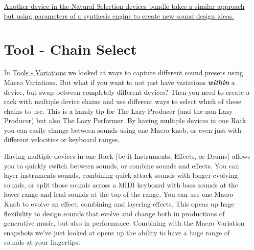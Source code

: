 \documentclass[
  12pt,
  letterpaper,
  oneside,
  open=any]{scrbook}
\begin{document}
\href{https://dillonbastan.com/store/maxforlive/index.php?product=natural-selection-s}{Another
device in the Natural Selection devices bundle takes a similar approach
but using parameters of a synthesis engine to create new sound design
ideas.}


\chapter{Tool - Chain Select}\label{Chapter-026-Tool-ChainSelect}

In \hyperref[Chapter-025-Tool-Variations]{Tools - Variations} we looked
at ways to capture different sound presets using Macro Variations. But
what if you want to not just have variations \textbf{\emph{within}} a
device, but swap between completely different devices? Then you need to
create a rack with multiple device chains and use different ways to
select which of these chains to use. This is a handy tip for The Lazy
Producer (and the non-Lazy Producer) but also The Lazy Performer. By
having multiple devices in one Rack you can easily change between sounds
using one Macro knob, or even just with different velocities or keyboard
ranges.

\begin{tcolorbox}[enhanced jigsaw, arc=.35mm, title=\textcolor{quarto-callout-tip-color}{\faLightbulb}\hspace{0.5em}{Key idea}, colback=white, opacitybacktitle=0.6, coltitle=black, toptitle=1mm, colframe=quarto-callout-tip-color-frame, bottomtitle=1mm, titlerule=0mm, rightrule=.15mm, bottomrule=.15mm, colbacktitle=quarto-callout-tip-color!10!white, toprule=.15mm, breakable, opacityback=0, left=2mm, leftrule=.75mm]

Having multiple devices in one Rack (be it Instruments, Effects, or
Drums) allows you to quickly switch between sounds, or combine sounds
and effects. You can layer instruments sounds, combining quick attack
sounds with longer evolving sounds, or split those sounds across a MIDI
keyboard with bass sounds at the lower range and lead sounds at the top
of the range. You can use one Macro Knob to evolve an effect, combining
and layering effects. This opens up huge flexibility to design sounds
that evolve and change both in productions of generative music, but also
in performance. Combining with the Macro Variation snapshots we've just
looked at opens up the ability to have a huge range of sounds at your
fingertips.

\end{tcolorbox}
\end{document}
